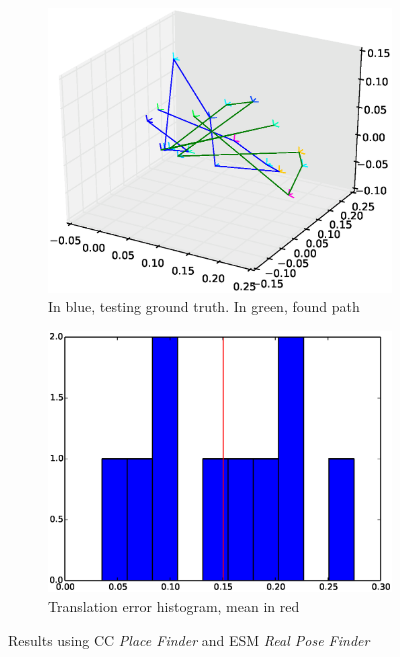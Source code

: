 \begin{figure}[htpb]
  \begin{subfigure}[b]{6cm}
          \includegraphics[width=\linewidth]{img/desktop_2_CC_esm_path_1.eps}
          \caption{In blue, testing ground truth. In green, found path}                
          \label{fig:desktop_2_CC_esm_path_1}
  \end{subfigure}   
  \qquad
  \begin{subfigure}[b]{6cm}
          \includegraphics[width=\linewidth]{img/desktop_2_CC_esm_dist_1.eps}
          \caption{Translation error histogram, mean in red} 
          \label{fig:desktop_2_CC_esm_dist_1}
  \end{subfigure}
  \caption{Results using CC \textit{Place Finder} and ESM  \textit{Real Pose Finder}}
\end{figure}


